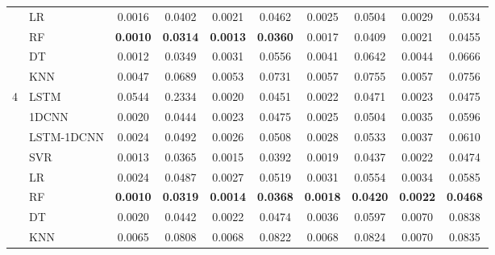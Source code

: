 {\begin{longtable}{clcccccccc}
    & LR & 0.0016 & 0.0402 & 0.0021 & 0.0462 & 0.0025 & 0.0504 & 0.0029 & 0.0534 \\
    & RF & \textbf{0.0010} & \textbf{0.0314} & \textbf{0.0013} & \textbf{0.0360} & 0.0017 & 0.0409 & 0.0021 & 0.0455 \\
    & DT & 0.0012 & 0.0349 & 0.0031 & 0.0556 & 0.0041 & 0.0642 & 0.0044 & 0.0666 \\
    & KNN & 0.0047 & 0.0689 & 0.0053 & 0.0731 & 0.0057 & 0.0755 & 0.0057 & 0.0756 \\
  \hline
  4 & LSTM & 0.0544 & 0.2334 & 0.0020 & 0.0451 & 0.0022 & 0.0471 & 0.0023 & 0.0475 \\
    & 1DCNN & 0.0020 & 0.0444 & 0.0023 & 0.0475 & 0.0025 & 0.0504 & 0.0035 & 0.0596 \\
    & LSTM-1DCNN & 0.0024 & 0.0492 & 0.0026 & 0.0508 & 0.0028 & 0.0533 & 0.0037 & 0.0610 \\
    & SVR & 0.0013 & 0.0365 & 0.0015 & 0.0392 & 0.0019 & 0.0437 & 0.0022 & 0.0474 \\
    & LR & 0.0024 & 0.0487 & 0.0027 & 0.0519 & 0.0031 & 0.0554 & 0.0034 & 0.0585 \\
    & RF & \textbf{0.0010} & \textbf{0.0319} & \textbf{0.0014} & \textbf{0.0368} & \textbf{0.0018} & \textbf{0.0420} & \textbf{0.0022} & \textbf{0.0468} \\
    & DT & 0.0020 & 0.0442 & 0.0022 & 0.0474 & 0.0036 & 0.0597 & 0.0070 & 0.0838 \\
    & KNN & 0.0065 & 0.0808 & 0.0068 & 0.0822 & 0.0068 & 0.0824 & 0.0070 & 0.0835 \\

\end{longtable}}
